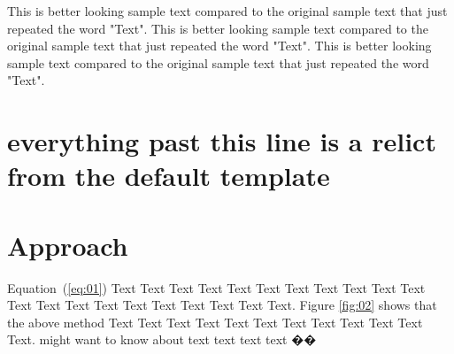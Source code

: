 \documentclass{bioinfo}
\begin{document}
This is better looking sample text compared to the original sample text that just repeated the word "Text". This is better looking sample text compared to the original sample text that just repeated the word "Text". This is better looking sample text compared to the original sample text that just repeated the word "Text".

\section{everything past this line is a relict from the default template}

\section{Approach}

Equation~(\ref{eq:01}) Text Text Text Text Text Text  Text Text Text Text Text Text Text Text Text  Text Text Text Text Text Text. Figure \ref{fig:02} shows that the above method  Text Text Text Text  Text Text Text Text Text Text  Text Text.  \citealp{Boffelli03} might want to know about  text text text text ��
\end{document}
